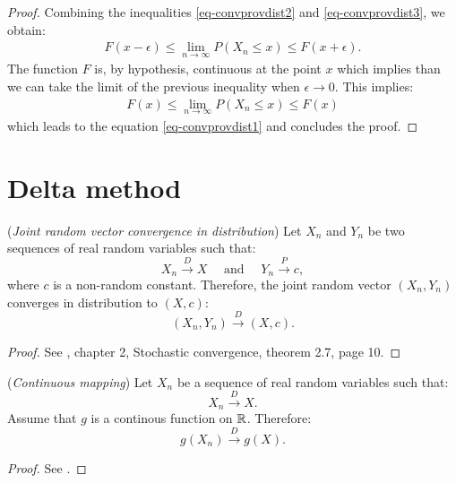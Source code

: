 \documentclass{article}
\begin{document}
\begin{proof}
Combining the inequalities \ref{eq-convprovdist2} and \ref{eq-convprovdist3}, we obtain: 
\begin{align*}
F(x-\epsilon) \leq \lim_{n\rightarrow \infty} P(X_n\leq x)  \leq F(x+\epsilon).
\end{align*}
The function $F$ is, by hypothesis, continuous at the point $x$ which implies than we can take 
the limit of the previous inequality when $\epsilon\rightarrow 0$. 
This implies:
\begin{align*}
F(x) \leq \lim_{n\rightarrow \infty} P(X_n\leq x)  \leq F(x)
\end{align*}
which leads to the equation \ref{eq-convprovdist1} and concludes the proof.
\end{proof}


\section{Delta method}


\begin{theorem}
\label{theo-jointrandomvector}
(\emph{Joint random vector convergence in distribution})
Let $X_n$ and $Y_n$ be two sequences of real random variables such that:
$$
X_n \xrightarrow{D} X \quad \textrm{ and } \quad Y_n \xrightarrow{P} c,
$$
where $c$ is a non-random constant. 
Therefore, the joint random vector $(X_n,Y_n)$ converges in distribution to $(X,c)$:
$$
(X_n,Y_n) \xrightarrow{D} (X, c) .
$$
\end{theorem}

\begin{proof}
See \cite{Vaart2000}, chapter 2, Stochastic convergence, theorem 2.7, page 10.
\end{proof}


\begin{theorem}
\label{theo-continuousmap}
(\emph{Continuous mapping})
Let $X_n$ be a sequence of real random variables such that:
$$
X_n \xrightarrow{D} X.
$$
Assume that $g$ is a continous function on $\mathbb{R}$. 
Therefore:
$$
g(X_n) \xrightarrow{D} g(X).
$$
\end{theorem}

\begin{proof}
See \cite{Vaart2000}.
\end{proof}
\end{document}
